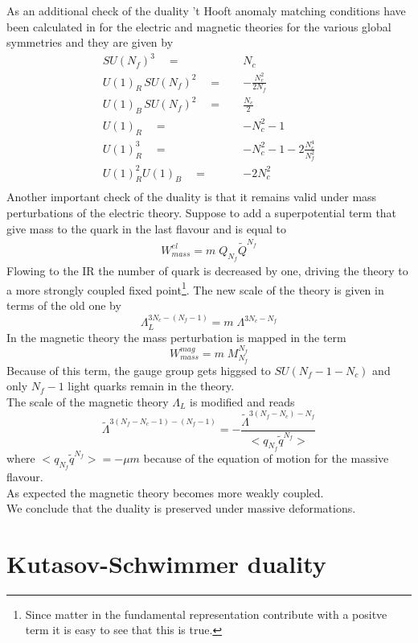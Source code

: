 As an additional check of the duality 't Hooft anomaly matching conditions have been calculated  in \cite{Seiberg:1994pq} for the electric and magnetic theories for the various global symmetries and they are given by
\begin{align}
SU(N_f)^3 \quad = \quad   & N_c \\
U(1)_R\, SU(N_f)^2 \quad = \quad  & -\frac{N_c^2}{2 N_f} \\
U(1)_B\, SU(N_f)^2 \quad = \quad  & \frac{N_c}{2} \\
U(1)_R \quad = \quad  & -N_c^2 - 1 \\
U(1)_R^3 \quad = \quad  & -N_c^2 - 1 - 2 \frac{N_c^4}{N_f^2} \\
U(1)_R^2 U(1)_B \quad = \quad  & - 2 N_c^2 \\
\end{align}
Another important check of the duality is that it remains valid under mass perturbations of the electric theory.
Suppose to add a superpotential term that give mass to the quark in the last flavour and is equal to
\begin{align}
	W_{mass}^{el} = m \; Q_{N_f} \tilde{Q}^{N_f}
\end{align}
Flowing to the IR the number of quark is decreased by one, driving the theory to a more strongly coupled fixed point\footnote{Since matter in the fundamental representation contribute with a positve term it is easy to see that this is true.}.
The new scale of the theory is given in terms of the old one by
\begin{equation}
 \Lambda_{L}^{3 N_c - (N_f - 1)} = m \; \Lambda^{3 N_c - N_f}
\end{equation}
In the magnetic theory the mass perturbation is mapped in the  term
\begin{equation}
W_{mass}^{mag} = m \; M_{N_f}^{N_f}
\end{equation}
Because of this term, the gauge group gets higgsed to $SU(N_f-1 - N_c)$ and only $N_f -1$ light quarks remain in the theory. \\
The scale of the magnetic theory $\Lambda_L$ is modified and reads
\begin{equation}
\tilde{\Lambda}^{3(N_f - N_c -1) - (N_f -1)} = 
- \frac{
	\tilde{\Lambda}^{3 (N_f - N_c) - N_f}	
	}
	{
	< q_{N_f} \tilde{q}^{N_f}		>
	}
\end{equation}
where $< q_{N_f} \tilde{q}^{N_f}> = - \mu m $ because of the equation of motion for the massive flavour. \\
As expected the magnetic theory becomes more weakly coupled.\\
We conclude that the duality is preserved under massive deformations.   




\section{Kutasov-Schwimmer duality}




